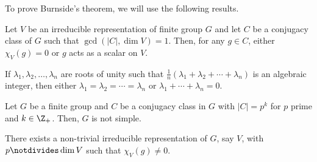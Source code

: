 \documentclass[11pt,leqno,oneside]{amsbook}
\numberwithin{thm}{section}
\begin{document}
To prove Burnside's theorem, we will use the following results.
\begin{thm}
  Let \(V\) be an irreducible representation of finite group \(G\) and
  let \(C\) be a conjugacy class of \(G\) such that \(\gcd(|C|,\dim V)
  = 1\). Then, for any \(g \in C\), either \(\chi_V(g) = 0\) or \(g\)
  acts as a scalar on \(V\).
\end{thm}
\begin{lem}
  If \(\lambda_1, \lambda_2, \ldots, \lambda_n\) are roots of unity
  such that \(\frac{1}{n}(\lambda_1 + \lambda_2 + \cdots +
  \lambda_n)\) is an algebraic integer, then either \(\lambda_1 =
  \lambda_2 = \cdots = \lambda_n\) or \(\lambda_1 + \cdots + \lambda_n
  = 0\).
\end{lem}
\begin{thm}
  Let \(G\) be a finite group and \(C\) be a conjugacy class in \(G\)
  with \(|C| = p^k\) for \(p\) prime and \(k \in \Z_+\). Then, \(G\)
  is not simple.
\end{thm}
\begin{lem}
  There exists a non-trivial irreducible representation of \(G\), say
  \(V\), with \(p \notdivides \dim V\) such that \(\chi_V(g) \neq 0\).
\end{lem}
\end{document}

